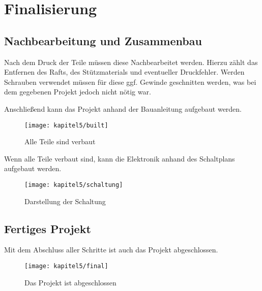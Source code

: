\chapter{Finalisierung}

\section{Nachbearbeitung und Zusammenbau}
Nach dem Druck der Teile müssen diese Nachbearbeitet werden. Hierzu zählt das Entfernen des Rafts, des Stützmaterials und eventueller Druckfehler. Werden Schrauben verwendet müssen für diese ggf. Gewinde geschnitten werden, was bei dem gegebenen Projekt jedoch nicht nötig war.

Anschließend kann das Projekt anhand der Bauanleitung aufgebaut werden.

\begin{figure}[h]
  \centering
  \texttt{[image: kapitel5/built]}
  \caption{Alle Teile sind verbaut}
  \label{Kap4:Built}
\end{figure}

Wenn alle Teile verbaut sind, kann die Elektronik anhand des Schaltplans aufgebaut werden.

\begin{figure}[h]
  \centering
  \texttt{[image: kapitel5/schaltung]}
  \caption{Darstellung der Schaltung}
  \label{Kap4:Schaltung}
\end{figure}

\clearpage

\section{Fertiges Projekt}
Mit dem Abschluss aller Schritte ist auch das Projekt abgeschlossen.

\begin{figure}[h]
  \centering
  \texttt{[image: kapitel5/final]}
  \caption{Das Projekt ist abgeschlossen}
  \label{Kap4:Final}
\end{figure}